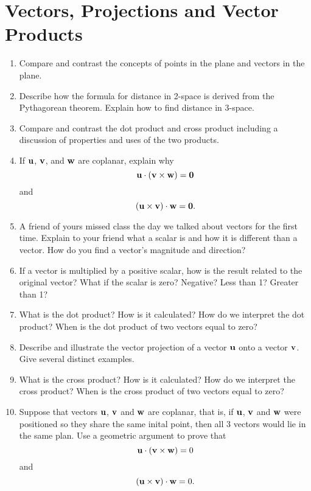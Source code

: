 \section{Vectors, Projections and Vector Products}

\begin{enumerate}

\item Compare and contrast the concepts of points in the plane and vectors in the plane. 
\item Describe how the formula for distance in 2-space is derived from the Pythagorean theorem.  Explain how to find distance in 3-space.
\item Compare and contrast the dot product and cross product including a discussion of properties and uses of the two products.
\item If $\bf{u}$, $\bf{v}$, and $\bf{w}$ are coplanar, explain why $$\bf{u} \cdot \left( {\bf{v} \times \bf{w}} \right) = 0$$ and $$\left( {\bf{u} \times \bf{v}} \right) \cdot \bf{w} = 0.$$
 \item A friend of yours missed class the day we talked about vectors for the first time.  Explain to your friend what a scalar is and how it is different than a vector.  How do you find a vector's magnitude and direction?
 \item If a vector is multiplied by a positive scalar, how is the result related to the original vector?  What if the scalar is zero?  Negative? \cite{FWG}  Less than 1?  Greater than 1?
 \item What is the dot product?  How is it calculated?  How do we interpret the dot product?  When is the dot product of two vectors equal to zero?
 \item Describe and illustrate the vector projection of a vector $\bf{u}$ onto a vector $\bf{v}$.  Give several distinct examples.
 \item What is the cross product?  How is it calculated?  How do we interpret the cross product?  When is the cross product of two vectors equal to zero?
 \item Suppose that vectors ${\bf{u}}$, ${\bf{v}}$ and ${\bf{w}}$ are coplanar, that is, if ${\bf{u}}$, ${\bf{v}}$ and ${\bf{w}}$ were positioned so they share the same inital point, then all 3 vectors would lie in the same plan.  Use a geometric argument to prove that $$
{\bf{u}} \cdot \left( {{\bf{v}} \times {\bf{w}}} \right) = 0
$$
and $$
\left( {{\bf{u}} \times {\bf{v}}} \right) \cdot {\bf{w}} = 0
.$$


\end{enumerate}
